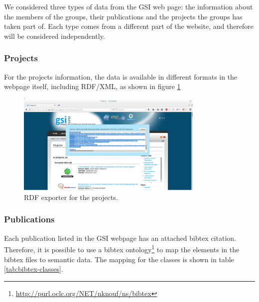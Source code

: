 We considered three types of data from the GSI web page: the information about the members of the groups, their publications and the projects the groups has taken part of. Each type comes from a different part of the website, and therefore will be considered independently. 

\subsubsection{Projects}

For the projects information, the data is available in different formats in the webpage itself, including RDF/XML, as shown in figure \ref{fig:gsiprojects}

\begin{figure}[!htbp]
    \centering
    \includegraphics[width=0.8\textwidth]{img/screens/gsi-projects.png}
    \caption{RDF exporter for the projects.}
    \label{fig:gsiprojects}
\end{figure}


\subsubsection{Publications}
\label{subsec:bibtexrdf}

Each publication listed in the GSI webpage has an attached bibtex citation. Therefore, it is possible to use a bibtex ontology\footnote{\url{http://purl.oclc.org/NET/nknouf/ns/bibtex}} to map the elements in the bibtex files to semantic data. The mapping for the classes is shown in table \ref{tab:bibtex-classes}.

